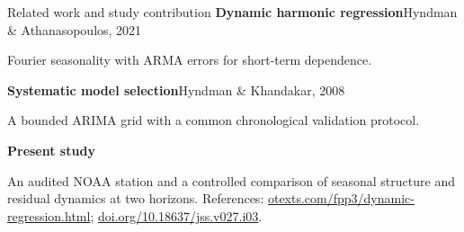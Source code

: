 \documentclass[aspectratio=169,11pt]{beamer}
\begin{document}
\begin{frame}{Related work and study contribution}
\textbf{Dynamic harmonic regression}\hfill{\footnotesize Hyndman \& Athanasopoulos, 2021}\par\smallskip
Fourier seasonality with ARMA errors for short-term dependence.\par\bigskip
\textbf{Systematic model selection}\hfill{\footnotesize Hyndman \& Khandakar, 2008}\par\smallskip
A bounded ARIMA grid with a common chronological validation protocol.\par\bigskip
\textbf{Present study}\par\smallskip
An audited NOAA station and a controlled comparison of seasonal structure and residual dynamics at two horizons.
\vfill{\scriptsize\color{WSUGray}References: \url{otexts.com/fpp3/dynamic-regression.html}; \url{doi.org/10.18637/jss.v027.i03}.}
\end{frame}
\end{document}
